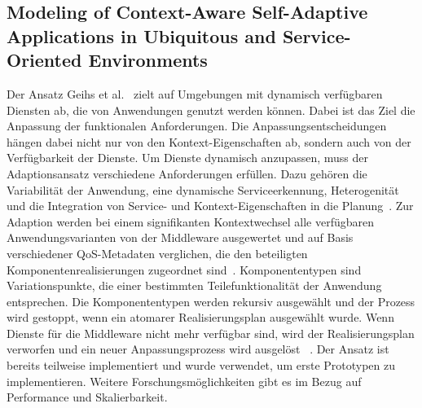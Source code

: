 \documentclass[conference,compsoc]{IEEEtran}
\begin{document}
\subsection{Modeling of Context-Aware Self-Adaptive Applications in Ubiquitous and Service-Oriented Environments}
Der Ansatz Geihs et al.~\cite{geihs2009modeling} zielt auf Umgebungen mit dynamisch verfügbaren Diensten ab, die von Anwendungen genutzt werden können. Dabei ist das Ziel die Anpassung der funktionalen Anforderungen. Die Anpassungsentscheidungen hängen dabei nicht nur von den Kontext-Eigenschaften ab, sondern auch von der Verfügbarkeit der Dienste. Um Dienste dynamisch anzupassen, muss der Adaptionsansatz verschiedene Anforderungen erfüllen. Dazu gehören die Variabilität der Anwendung, eine dynamische Serviceerkennung, Heterogenität und die Integration von Service- und Kontext-Eigenschaften in die Planung~\cite{geihs2009modeling}.
Zur Adaption werden bei einem signifikanten Kontextwechsel alle verfügbaren Anwendungsvarianten von der Middleware ausgewertet und auf Basis verschiedener QoS-Metadaten verglichen, die den beteiligten Komponentenrealisierungen zugeordnet sind~\cite{geihs2009modeling}. Komponententypen sind Variationspunkte, die einer bestimmten Teilefunktionalität der Anwendung entsprechen. Die Komponententypen werden rekursiv ausgewählt und der Prozess wird gestoppt, wenn ein atomarer Realisierungsplan ausgewählt wurde.
Wenn Dienste für die Middleware nicht mehr verfügbar sind, wird der Realisierungsplan verworfen und ein neuer Anpassungsprozess wird ausgelöst ~\cite{geihs2009modeling}.
Der Ansatz ist bereits teilweise implementiert und wurde verwendet, um erste Prototypen zu implementieren. Weitere Forschungsmöglichkeiten gibt es im Bezug auf Performance und Skalierbarkeit.
\end{document}
